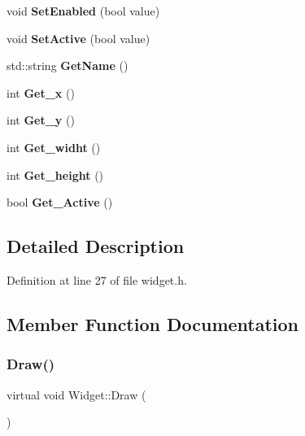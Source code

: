 \begin{DoxyCompactItemize}
void {\bfseries Set\+Enabled} (bool value)
\item 
\mbox{\label{class_widget_a5a99f29f57e081e77f21b77a85259e41}} 
void {\bfseries Set\+Active} (bool value)
\item 
\mbox{\label{class_widget_a78c440f86f566176222e94c6fd0fa417}} 
std\+::string {\bfseries Get\+Name} ()
\item 
\mbox{\label{class_widget_a23c8bd8c98034ea73c5c87713e8006e7}} 
int {\bfseries Get\+\_\+x} ()
\item 
\mbox{\label{class_widget_af5f0c02d954127078a33669d44050cef}} 
int {\bfseries Get\+\_\+y} ()
\item 
\mbox{\label{class_widget_a23525d66c09f55f86307c2421b25ff73}} 
int {\bfseries Get\+\_\+widht} ()
\item 
\mbox{\label{class_widget_a46b187c346da22a349952b1577240dc3}} 
int {\bfseries Get\+\_\+height} ()
\item 
\mbox{\label{class_widget_a6d58e267ab3c59a2c43f4426c6b63002}} 
bool {\bfseries Get\+\_\+\+Active} ()
\end{DoxyCompactItemize}


\subsection{Detailed Description}


Definition at line 27 of file widget.\+h.



\subsection{Member Function Documentation}
\mbox{\label{class_widget_ac4c2063cd671468ad05d84cfe963c032}} 
\subsubsection{\texorpdfstring{Draw()}{Draw()}}
{\footnotesize\ttfamily virtual void Widget\+::\+Draw (\begin{DoxyParamCaption}{ }\end{DoxyParamCaption})\hspace{0.3cm}{\ttfamily [pure virtual]}}



